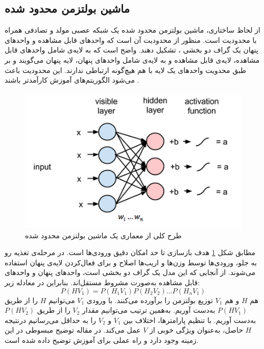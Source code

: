\subsection{ماشین بولتزمن محدود شده}
از لحاظ ساختاری، ماشین بولتزمن محدود شده
یک شبکه عصبی مولد و تصادفی
همراه با محدودیت است. منظور از محدودیت آن است که واحدهای قابل مشاهده
و واحدهای پنهان
یک گراف دو بخشی
،
تشکیل ‌دهند. واضح است که به لایه‌ی شامل واحدهای قابل مشاهده، لایه‌ی قابل مشاهده و به لایه‌ی شامل واحدهای پنهان، لایه پنهان می‌گویند و بر طبق محدویت 
واحدهای یک لایه با هم هیچ‌گونه ارتباطی ندارند. این محدودیت باعث می‌شود الگوریتم‌های آموزش کارآمدتر باشند
\cite{Hinton GE1986}.

\begin{figure}[!h]
\centering
\includegraphics[scale=0.9]{section2/RBM.png}
	\caption{طرح کلی از معماری یک ماشین بولتزمن محدود شده}
\label{RBM}
\end{figure}

مطابق شکل
\ref{RBM}
هدف
بازسازی تا حد امکان دقیق ورودی‌ها است. در مرحله‌ی تغذیه رو به جلو، ورودی‌ها توسط وزن‌ها و اریب‌ها اصلاح و برای فعال‌کردن لایه‌ی پنهان استفاده می‌شوند. از آنجایی که این مدل یک گراف دو بخشی است، واحدهای پنهان
و واحدهای قابل مشاهده
به‌صورت مشروط مستقل‌اند. بنابراین در معادله زیر:
\begin{equation}
P(HV_1) = P(H_1V_1)P(H_2V_2) ... P(H_nV_1)
\end{equation}
هم
$H$
و هم 
$V_1$
توزیع بولتزمن را برآورده می‌کنند. با ورودی
$V_1$
می‌توانیم
$H $
را از طریق 
$P(HV_1)$
به‌دست آوریم. به‌همین ترتیب می‌توانیم مقدار
$V_2$ 
را از طریق 
$P(HV_2)$
به‌دست آوریم. با تنظیم پارامترها، اختلاف بین
$V_1$
و
$V_2$
را به حداقل می‌رسانیم درنتیجه
$H$
حاصل، به‌عنوان ویژگی خوبی از
$V$
عمل می‌کند. در مقاله 
\cite{Hinton GE1986}
توضیح مبسوطی در این زمینه وجود دارد و راه عملی برای آموزش
توضیح داده شده است.

